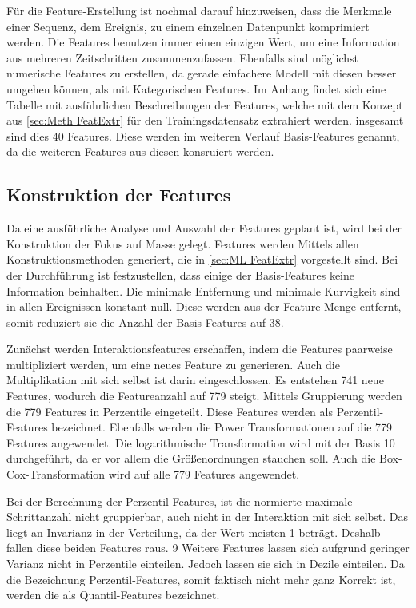 Für die Feature-Erstellung ist nochmal darauf hinzuweisen, dass die Merkmale einer Sequenz, dem Ereignis, zu einem einzelnen Datenpunkt komprimiert werden. Die Features benutzen immer einen einzigen Wert, um eine Information aus mehreren Zeitschritten zusammenzufassen. Ebenfalls sind möglichst numerische Features zu erstellen, da gerade einfachere Modell mit diesen besser umgehen können, als mit Kategorischen Features. Im Anhang findet sich eine Tabelle mit ausführlichen Beschreibungen der Features, welche mit dem Konzept aus \ref{sec:Meth FeatExtr} für den Trainingsdatensatz extrahiert werden. insgesamt sind dies 40 Features. Diese werden im weiteren Verlauf Basis-Features genannt, da die weiteren Features aus diesen konsruiert werden.\par


\subsection{Konstruktion der Features} \label{sec:Meth KonstrFeatures}
Da eine ausführliche Analyse und Auswahl der Features geplant ist, wird bei der Konstruktion der Fokus auf Masse gelegt. Features werden Mittels allen Konstruktionsmethoden generiert, die in \ref{sec:ML FeatExtr} vorgestellt sind. Bei der Durchführung ist festzustellen, dass einige der Basis-Features keine Information beinhalten. Die minimale Entfernung und minimale Kurvigkeit sind in allen Ereignissen konstant null. Diese werden aus der Feature-Menge entfernt, somit reduziert sie die Anzahl der Basis-Features auf 38.\par

Zunächst werden Interaktionsfeatures erschaffen, indem die Features paarweise multipliziert werden, um eine neues Feature zu generieren. Auch die Multiplikation mit sich selbst ist darin eingeschlossen. Es entstehen 741 neue Features, wodurch die Featureanzahl auf 779 steigt. Mittels Gruppierung werden die 779 Features in Perzentile eingeteilt. Diese Features werden als Perzentil-Features bezeichnet. Ebenfalls werden die Power Transformationen auf die 779 Features angewendet. Die logarithmische Transformation wird mit der Basis 10 durchgeführt, da er vor allem die Größenordnungen stauchen soll. Auch die Box-Cox-Transformation wird auf alle 779 Features angewendet. \par

Bei der Berechnung der Perzentil-Features, ist die normierte maximale Schrittanzahl nicht gruppierbar, auch nicht in der Interaktion mit sich selbst. Das liegt an Invarianz in der Verteilung, da der Wert meisten 1 beträgt. Deshalb fallen diese beiden Features raus. 9 Weitere Features lassen sich aufgrund geringer Varianz nicht in Perzentile einteilen. Jedoch lassen sie sich in Dezile einteilen. Da die Bezeichnung Perzentil-Features, somit faktisch nicht mehr ganz Korrekt ist, werden die als Quantil-Features bezeichnet. \par

